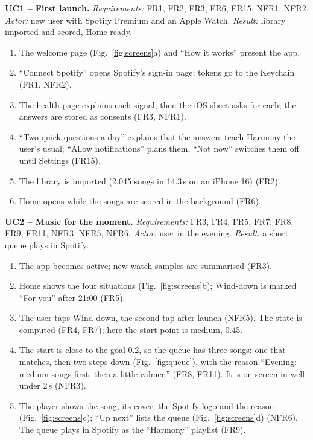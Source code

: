 \documentclass[conference]{IEEEtran}
\begin{document}
\textbf{UC1 -- First launch.} \emph{Requirements:} FR1, FR2, FR3, FR6, FR15, NFR1, NFR2. \emph{Actor:} new user with Spotify Premium and an Apple Watch. \emph{Result:} library imported and scored, Home ready.
\begin{enumerate}
\item The welcome page (Fig.~\ref{fig:screens}a) and ``How it works'' present the app.
\item ``Connect Spotify'' opens Spotify's sign-in page; tokens go to the Keychain (FR1, NFR2).
\item The health page explains each signal, then the iOS sheet asks for each; the answers are stored as consents (FR3, NFR1).
\item ``Two quick questions a day'' explains that the answers teach Harmony the user's usual; ``Allow notifications'' plans them, ``Not now'' switches them off until Settings (FR15).
\item The library is imported (2,045 songs in 14.3\,s on an iPhone 16) (FR2).
\item Home opens while the songs are scored in the background (FR6).
\end{enumerate}

\textbf{UC2 -- Music for the moment.} \emph{Requirements:} FR3, FR4, FR5, FR7, FR8, FR9, FR11, NFR3, NFR5, NFR6. \emph{Actor:} user in the evening. \emph{Result:} a short queue plays in Spotify.
\begin{enumerate}
\item The app becomes active; new watch samples are summarised (FR3).
\item Home shows the four situations (Fig.~\ref{fig:screens}b); Wind-down is marked ``For you'' after 21:00 (FR5).
\item The user taps Wind-down, the second tap after launch (NFR5). The state is computed (FR4, FR7); here the start point is medium, 0.45.
\item The start is close to the goal 0.2, so the queue has three songs: one that matches, then two steps down (Fig.~\ref{fig:queue}), with the reason ``Evening: medium songs first, then a little calmer.'' (FR8, FR11). It is on screen in well under 2\,s (NFR3).
\item The player shows the song, its cover, the Spotify logo and the reason (Fig.~\ref{fig:screens}c); ``Up next'' lists the queue (Fig.~\ref{fig:screens}d) (NFR6). The queue plays in Spotify as the ``Harmony'' playlist (FR9).
\end{enumerate}
\end{document}
